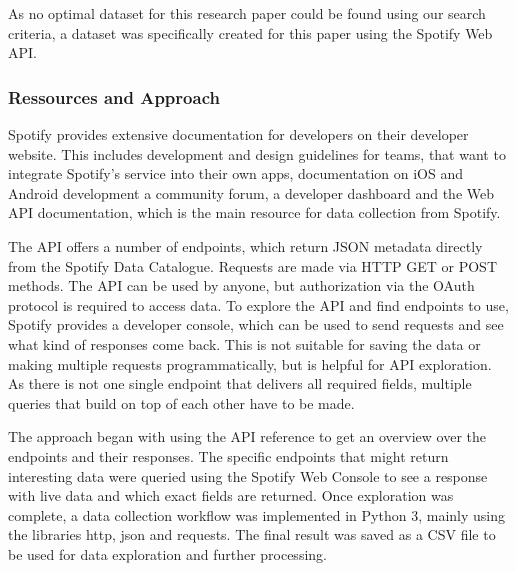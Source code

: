As no optimal dataset for this research paper could be found using our search criteria,
a dataset was specifically created for this paper using the Spotify Web API.

\subsubsection{Ressources and Approach}

Spotify provides extensive documentation for developers on their developer website.\cite{SpotifyDev}
This includes development and design guidelines for teams, that want to integrate
Spotify's service into their own apps, documentation on iOS and Android development
a community forum, a developer dashboard and the Web API documentation, which is the main resource
for data collection from Spotify.

The \ac{API} offers a number of endpoints, which return \ac{JSON} metadata
directly from the Spotify Data Catalogue\cite{SpotifyWebAPI}.
Requests are made via HTTP GET or POST methods.
The \ac{API} can be used by anyone, but authorization via the OAuth protocol is required to access data.
To explore the \ac{API} and find endpoints to use, Spotify provides a developer console, which can be used to 
send requests and see what kind of responses come back. This is not suitable for saving the data or making multiple
requests programmatically, but is helpful for API exploration. As there is not one single endpoint that delivers all
required fields, multiple queries that build on top of each other have to be made.

The approach began with using the \ac{API} reference to get an overview over the endpoints and their responses.
The specific endpoints that might return interesting data were queried using the Spotify Web Console to see
a response with live data and which exact fields are returned.
Once exploration was complete, a data collection workflow was implemented in Python 3, mainly using the
libraries http, json and requests. The final result was saved as a CSV file to be used for data exploration
and further processing.

